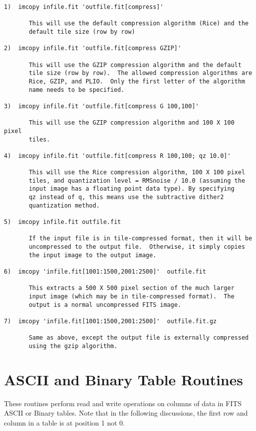 \documentclass[11pt]{book}
\begin{document}
\begin{verbatim}
1)  imcopy infile.fit 'outfile.fit[compress]'

       This will use the default compression algorithm (Rice) and the
       default tile size (row by row)

2)  imcopy infile.fit 'outfile.fit[compress GZIP]'

       This will use the GZIP compression algorithm and the default
       tile size (row by row).  The allowed compression algorithms are
       Rice, GZIP, and PLIO.  Only the first letter of the algorithm
       name needs to be specified.

3)  imcopy infile.fit 'outfile.fit[compress G 100,100]'

       This will use the GZIP compression algorithm and 100 X 100 pixel
       tiles.

4)  imcopy infile.fit 'outfile.fit[compress R 100,100; qz 10.0]'

       This will use the Rice compression algorithm, 100 X 100 pixel
       tiles, and quantization level = RMSnoise / 10.0 (assuming the
       input image has a floating point data type). By specifying
       qz instead of q, this means use the subtractive dither2
       quantization method.

5)  imcopy infile.fit outfile.fit

       If the input file is in tile-compressed format, then it will be
       uncompressed to the output file.  Otherwise, it simply copies
       the input image to the output image.

6)  imcopy 'infile.fit[1001:1500,2001:2500]'  outfile.fit

       This extracts a 500 X 500 pixel section of the much larger
       input image (which may be in tile-compressed format).  The
       output is a normal uncompressed FITS image.

7)  imcopy 'infile.fit[1001:1500,2001:2500]'  outfile.fit.gz

       Same as above, except the output file is externally compressed
       using the gzip algorithm.

\end{verbatim}

\section{ASCII and Binary Table Routines}

These routines perform read and write operations on columns of data in
FITS ASCII or Binary tables.  Note that in the following discussions,
the first row and column in a table is at position 1 not 0.
\end{document}
